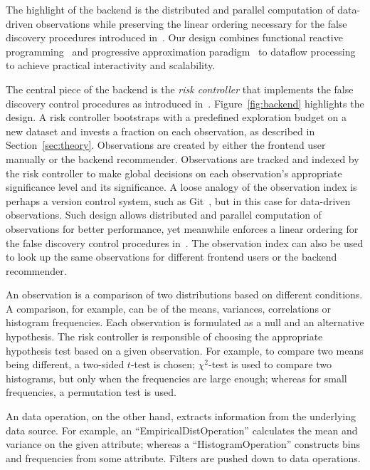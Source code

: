 The highlight of the \system{} backend is the distributed and parallel computation of data-driven observations while preserving the linear ordering necessary for the false discovery procedures introduced in~\cite{zhao2016controlling}.  Our design combines functional reactive programming~\cite{wan2000functional} and progressive approximation paradigm~\cite{onlineagg,zgraggen2016progressive,vizdom} to dataflow processing to achieve practical interactivity and scalability.

The central piece of the \system{} backend is the \textit{risk controller} that implements the false discovery control procedures as introduced in~\cite{zhao2016controlling}.  Figure~\ref{fig:backend} highlights the design.  A risk controller bootstraps with a predefined exploration budget on a new dataset and invests a fraction on each observation, as described in Section~\ref{sec:theory}.  Observations are created by either the frontend user manually or the backend recommender.  Observations are tracked and indexed by the risk controller to make global decisions on each observation's appropriate significance level and its significance. A loose analogy of the observation index is perhaps a version control system, such as Git~\cite{torvalds2010git}, but in this case for data-driven observations. Such design allows distributed and parallel computation of observations for better performance, yet meanwhile enforces a linear ordering for the false discovery control procedures in~\cite{zhao2016controlling}. The observation index can also be used to look up the same observations for different frontend users or the backend recommender. 

An observation is a comparison of two distributions based on different conditions.  A comparison, for example, can be of the means, variances, correlations or histogram frequencies. Each observation is formulated as a null and an alternative hypothesis.  The risk controller is responsible of choosing the appropriate hypothesis test based on a given observation.  For example, to compare two means being different, a two-sided $t$-test is chosen; $\chi^2$-test is used to compare two histograms, but only when the frequencies are large enough; whereas for small frequencies, a permutation test is used. 

An data operation, on the other hand, extracts information from the underlying data source.  For example, an ``EmpiricalDistOperation'' calculates the mean and variance on the given attribute; whereas a ``HistogramOperation'' constructs bins and frequencies from some attribute.  Filters are pushed down to data operations.

